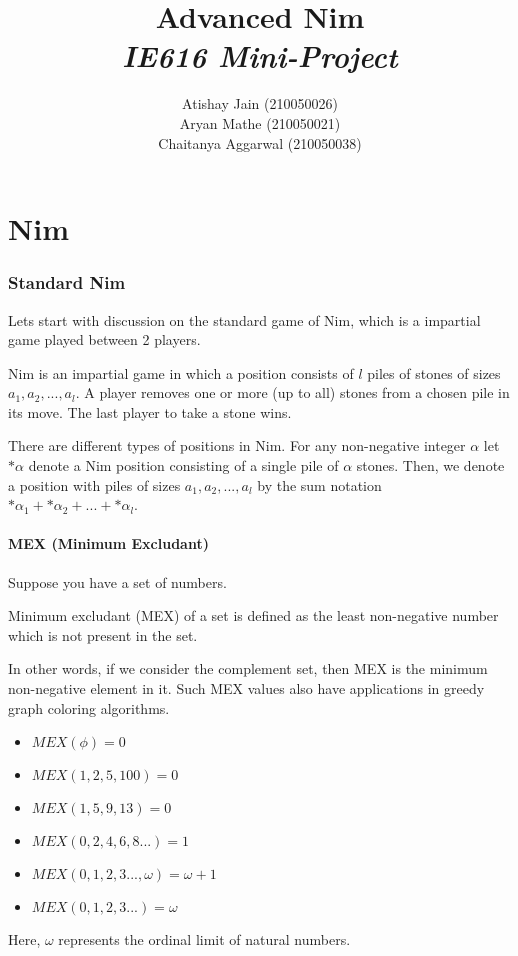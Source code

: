 \documentclass[11pt]{article}
\title{{Advanced Nim}\\{\normalsize{\itshape IE616 Mini-Project}}}
\author{Atishay Jain (210050026)  \\ Aryan Mathe (210050021) \\ Chaitanya Aggarwal (210050038)}
\begin{document}
\maketitle
\pagestyle{fancynotes}


\part{Nim}       
\vspace{2mm}
\section{Standard Nim}
Lets start with discussion on the standard game of Nim, which is a impartial game played between 2 players.
\begin{definition}
Nim is an impartial game in which a position consists of $l$ piles of stones of sizes $a_1, a_2, ..., a_l$. A player removes one or more (up to all) stones from a chosen pile in its move. The last player to take a stone wins.
\end{definition}
There are different types of positions in Nim. For any non-negative integer $\alpha$ let $*\alpha$ denote a Nim position consisting of a single pile of $\alpha$ stones. Then, we denote a position with piles of sizes $a_1, a_2, ... , a_l$ by the sum notation $*\alpha_1 + *\alpha_2 + ... + *\alpha_l$.

\subsection{MEX (Minimum Excludant)}
Suppose you have a set of numbers. 
\begin{definition}
Minimum excludant (MEX) of a set is defined as the least non-negative number which is not present in the set. 
\end{definition}
In other words, if we consider the complement set, then MEX is the minimum non-negative element in it. Such MEX values also have applications in greedy graph coloring algorithms. 
\begin{example}
\begin{itemize}
    \item $MEX(\phi) = 0$
    \item $MEX(1,2,5,100) = 0$
    \item $MEX(1,5,9,13) = 0$
    \item $MEX(0,2,4,6,8 ... ) = 1$
    \item $MEX(0,1,2,3 ... , \omega) = \omega + 1$
    \item $MEX(0,1,2,3 ...) = \omega$
\end{itemize}
\end{example}	
\begin{remark}
Here, $\omega$ represents the ordinal limit of natural numbers.
\end{remark}
\end{document}
